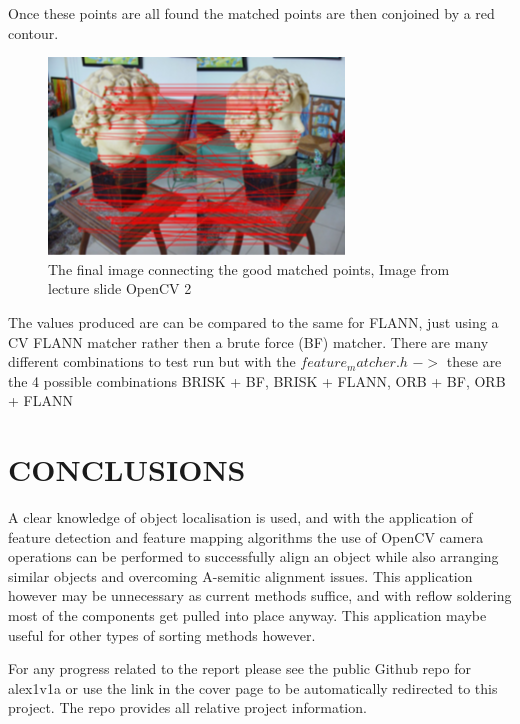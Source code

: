 \documentclass[a4paper, 10pt]{IEEEconf}
\begin{document}
Once these points are all found the matched points are then conjoined by a red contour. 
\begin{figure}[H]
  \includegraphics[width=0.7\linewidth,center]{images/3}
  \caption{The final image connecting the good matched points, Image from lecture slide OpenCV 2 \cite{Lecture2}}
  \label{fig:The final image connecting the good matched points}
\end{figure}
The values produced are can be compared to the same for FLANN, just using a CV FLANN matcher rather then a brute force (BF) matcher. There are many different combinations to test run but with the $feature_matcher.h$ $->$ these are the 4 possible combinations BRISK + BF, BRISK + FLANN, ORB + BF, ORB + FLANN


\section{CONCLUSIONS}
A clear knowledge of object localisation is used, and with the application of feature detection and feature mapping algorithms the use of OpenCV camera operations can be performed to successfully align an object while also arranging similar objects and overcoming A-semitic alignment issues. This application however may be unnecessary as current methods suffice, and with reflow soldering most of the components get pulled into place anyway. This application maybe useful for other types of sorting methods however. 

For any progress related to the report please see the public Github repo for alex1v1a or use the link in the cover page to be automatically redirected to this project. The repo provides all relative project information.
\end{document}
